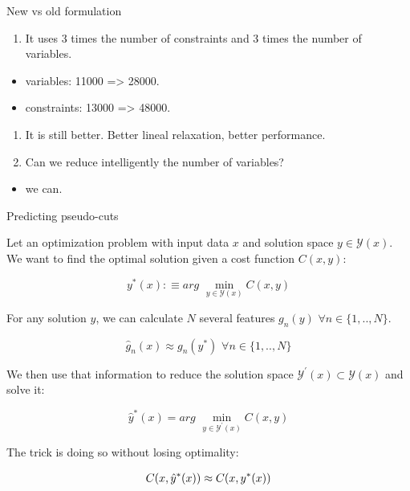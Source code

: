 \documentclass[usenames,dvipsnames]{beamer}
\begin{document}
\begin{frame}

\begin{block}{New vs old formulation}

\begin{enumerate}[<+->]

\item
  It uses 3 times the number of constraints and 3 times the number of
  variables.
\end{enumerate}

\begin{itemize}[<+->]

\item
  variables: 11000 =\textgreater{} 28000.
\item
  constraints: 13000 =\textgreater{} 48000.
\end{itemize}

\begin{enumerate}[<+->]

\item
  It is still better. Better lineal relaxation, better performance.
\item
  Can we reduce intelligently the number of variables?
\end{enumerate}

\begin{itemize}[<+->]

\item
  we can.
\end{itemize}

\end{block}

\end{frame}

\begin{frame}

\begin{block}{Predicting pseudo-cuts}

Let an optimization problem with input data \(x\) and solution space
\(y \in \mathcal{Y}(x)\). We want to find the optimal solution given a
cost function \(C(x,y)\):

\[
y^{*}(x) :\equiv arg \,\,\min_{y \in \mathcal{Y}(x)} C(x,y)
\]

For any solution \(y\), we can calculate \(N\) several features
\(g_n(y) \,\, \forall n \in \{1, .., N\}\).

\[
\hat{g}_n(x) \approx g_n(y^{*}) \,\, \forall n \in \{1, .., N\}
\]

We then use that information to reduce the solution space
\(\mathcal{Y}^\prime(x) \subset \mathcal{Y}(x)\) and solve it:

\[\hat{y}^{*}(x) = arg \,\,\min_{y \in \mathcal{Y}^\prime(x)} C(x,y)\]

The trick is doing so without losing optimality:

\begin{align}
    C(x,\hat{y}^{*}(x)) \approx  C(x,y^{*}(x) ) \notag
\end{align}

\end{block}

\end{frame}
\end{document}
